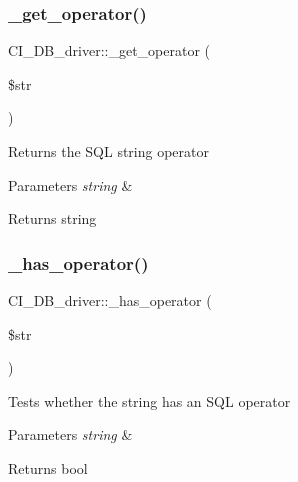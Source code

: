 \subsubsection{\texorpdfstring{\+\_\+get\+\_\+operator()}{\_get\_operator()}}
{\footnotesize\ttfamily C\+I\+\_\+\+D\+B\+\_\+driver\+::\+\_\+get\+\_\+operator (\begin{DoxyParamCaption}\item[{}]{\$str }\end{DoxyParamCaption})\hspace{0.3cm}{\ttfamily [protected]}}

Returns the S\+QL string operator


\begin{DoxyParams}{Parameters}
{\em string} & \\
\hline
\end{DoxyParams}
\begin{DoxyReturn}{Returns}
string 
\end{DoxyReturn}
\mbox{\label{class_c_i___d_b__driver_afa4a529214491037c0a38afd86397383}} 
\subsubsection{\texorpdfstring{\+\_\+has\+\_\+operator()}{\_has\_operator()}}
{\footnotesize\ttfamily C\+I\+\_\+\+D\+B\+\_\+driver\+::\+\_\+has\+\_\+operator (\begin{DoxyParamCaption}\item[{}]{\$str }\end{DoxyParamCaption})\hspace{0.3cm}{\ttfamily [protected]}}

Tests whether the string has an S\+QL operator


\begin{DoxyParams}{Parameters}
{\em string} & \\
\hline
\end{DoxyParams}
\begin{DoxyReturn}{Returns}
bool 
\end{DoxyReturn}
\mbox{\label{class_c_i___d_b__driver_a04aaae0b2a6d65ecf7191e6edc8e40fb}} 
